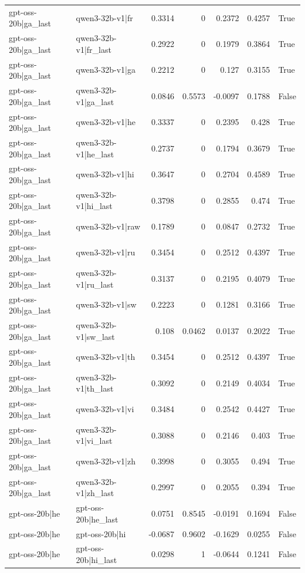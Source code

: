 \begin{table}
\begin{tabular}{l l r r r r l}
gpt-oss-20b|ga_last & qwen3-32b-v1|fr & 0.3314 & 0 & 0.2372 & 0.4257 & True \\
gpt-oss-20b|ga_last & qwen3-32b-v1|fr_last & 0.2922 & 0 & 0.1979 & 0.3864 & True \\
gpt-oss-20b|ga_last & qwen3-32b-v1|ga & 0.2212 & 0 & 0.127 & 0.3155 & True \\
gpt-oss-20b|ga_last & qwen3-32b-v1|ga_last & 0.0846 & 0.5573 & -0.0097 & 0.1788 & False \\
gpt-oss-20b|ga_last & qwen3-32b-v1|he & 0.3337 & 0 & 0.2395 & 0.428 & True \\
gpt-oss-20b|ga_last & qwen3-32b-v1|he_last & 0.2737 & 0 & 0.1794 & 0.3679 & True \\
gpt-oss-20b|ga_last & qwen3-32b-v1|hi & 0.3647 & 0 & 0.2704 & 0.4589 & True \\
gpt-oss-20b|ga_last & qwen3-32b-v1|hi_last & 0.3798 & 0 & 0.2855 & 0.474 & True \\
gpt-oss-20b|ga_last & qwen3-32b-v1|raw & 0.1789 & 0 & 0.0847 & 0.2732 & True \\
gpt-oss-20b|ga_last & qwen3-32b-v1|ru & 0.3454 & 0 & 0.2512 & 0.4397 & True \\
gpt-oss-20b|ga_last & qwen3-32b-v1|ru_last & 0.3137 & 0 & 0.2195 & 0.4079 & True \\
gpt-oss-20b|ga_last & qwen3-32b-v1|sw & 0.2223 & 0 & 0.1281 & 0.3166 & True \\
gpt-oss-20b|ga_last & qwen3-32b-v1|sw_last & 0.108 & 0.0462 & 0.0137 & 0.2022 & True \\
gpt-oss-20b|ga_last & qwen3-32b-v1|th & 0.3454 & 0 & 0.2512 & 0.4397 & True \\
gpt-oss-20b|ga_last & qwen3-32b-v1|th_last & 0.3092 & 0 & 0.2149 & 0.4034 & True \\
gpt-oss-20b|ga_last & qwen3-32b-v1|vi & 0.3484 & 0 & 0.2542 & 0.4427 & True \\
gpt-oss-20b|ga_last & qwen3-32b-v1|vi_last & 0.3088 & 0 & 0.2146 & 0.403 & True \\
gpt-oss-20b|ga_last & qwen3-32b-v1|zh & 0.3998 & 0 & 0.3055 & 0.494 & True \\
gpt-oss-20b|ga_last & qwen3-32b-v1|zh_last & 0.2997 & 0 & 0.2055 & 0.394 & True \\
gpt-oss-20b|he & gpt-oss-20b|he_last & 0.0751 & 0.8545 & -0.0191 & 0.1694 & False \\
gpt-oss-20b|he & gpt-oss-20b|hi & -0.0687 & 0.9602 & -0.1629 & 0.0255 & False \\
gpt-oss-20b|he & gpt-oss-20b|hi_last & 0.0298 & 1 & -0.0644 & 0.1241 & False \\

\end{tabular}
\end{table}
